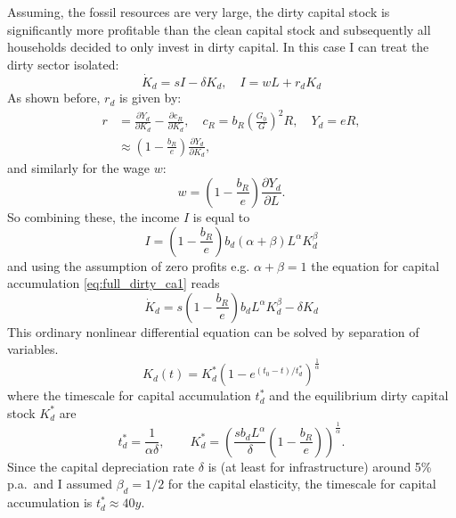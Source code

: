 Assuming, the fossil resources are very large, the dirty capital stock is significantly more profitable than the clean capital stock and subsequently all households decided to only invest in dirty capital. In this case I can treat the dirty sector isolated:
\begin{equation}
	\dot{K}_d = s I - \delta K_d, \quad I = w L + r_d K_d
	\label{eq:full_dirty_ca1}
\end{equation}
As shown before, $r_d$ is given by:
\begin{align}
	r &= \frac{\partial Y_d}{\partial K_d} - \frac{\partial c_R}{\partial K_d}, \quad c_R = b_R\left( \frac{G_0}{G} \right)^{2} R, \quad Y_d = eR, \\
	&\approx \left( 1-\frac{b_R}{e} \right)\frac{\partial Y_d}{\partial K_d},
	\label{eq:full_dirty_capital_rent}
\end{align}
and similarly for the wage $w$:
\begin{equation}
	w = \left( 1-\frac{b_R}{e} \right)\frac{\partial Y_d}{\partial L}.
	\label{eq:full_dirty_wage}
\end{equation}
So combining these, the income $I$ is equal to
\begin{equation}
	I = \left( 1-\frac{b_R}{e} \right)b_d (\alpha + \beta) L^{\alpha} K_d^{\beta}
	\label{eq_full_dirty_income}
\end{equation}
and using the assumption of zero profits e.g. $\alpha + \beta = 1$ the equation for capital accumulation \eqref{eq:full_dirty_ca1} reads
\begin{equation}
	\dot{K}_d = s\left( 1 - \frac{b_R}{e} \right) b_d L^{\alpha} K_d^{\beta} - \delta K_d
	\label{eq:full_dirty_ca2}
\end{equation}
This ordinary nonlinear differential equation can be solved by separation of variables.
\begin{equation}
  K_d (t) = K_d^{*} \left(1 - e^{(t_0-t)/t_d^{*}} \right)^{\frac{1}{\alpha}}
	\label{eq:dirty_capital_ac_solution}
\end{equation}
where the timescale for capital accumulation $t^*_d$ and the equilibrium dirty capital stock $K^*_d$ are
\begin{equation}
	t_d^{*} = \frac{1}{\alpha \delta}, \qquad K_d^{*} = \left( \frac{s b_d L^\alpha}{\delta}\left(1-\frac{b_R}{e}  \right) \right)^{\frac{1}{\alpha}}.
	\label{eq:full_dirty_capital_equilibrium_values}
\end{equation}
Since the capital depreciation rate $\delta$ is (at least for infrastructure) around 5\% p.a.\ and I assumed $\beta_d=1/2$ for the capital elasticity, the timescale for capital accumulation is $t^*_d \approx 40 y$.




